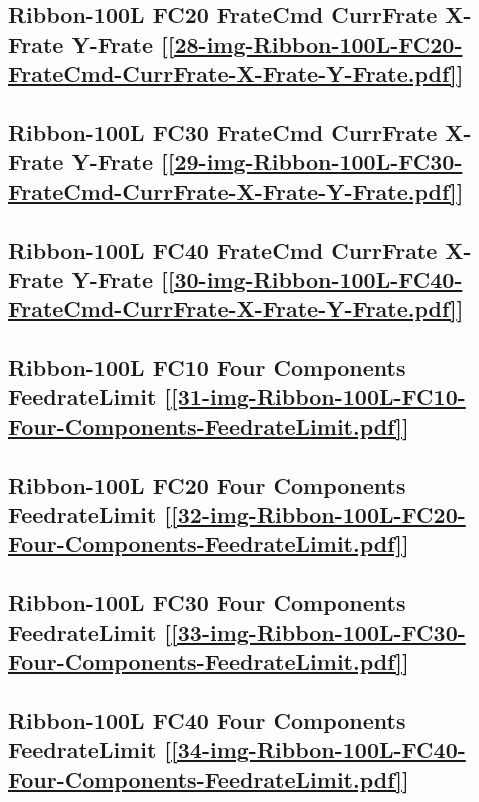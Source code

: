 \subsection       {Ribbon-100L FC20 FrateCmd CurrFrate X-Frate Y-Frate
	[\ref      {28-img-Ribbon-100L-FC20-FrateCmd-CurrFrate-X-Frate-Y-Frate.pdf}] }
\label{ssec-28-img-Ribbon-100L-FC20-FrateCmd-CurrFrate-X-Frate-Y-Frate.pdf}

\subsection       {Ribbon-100L FC30 FrateCmd CurrFrate X-Frate Y-Frate
	[\ref      {29-img-Ribbon-100L-FC30-FrateCmd-CurrFrate-X-Frate-Y-Frate.pdf}] }
\label{ssec-29-img-Ribbon-100L-FC30-FrateCmd-CurrFrate-X-Frate-Y-Frate.pdf}

\subsection       {Ribbon-100L FC40 FrateCmd CurrFrate X-Frate Y-Frate
	[\ref      {30-img-Ribbon-100L-FC40-FrateCmd-CurrFrate-X-Frate-Y-Frate.pdf}] }
\label{ssec-30-img-Ribbon-100L-FC40-FrateCmd-CurrFrate-X-Frate-Y-Frate.pdf}

\subsection       {Ribbon-100L FC10 Four Components FeedrateLimit
	[\ref      {31-img-Ribbon-100L-FC10-Four-Components-FeedrateLimit.pdf}] }
\label{ssec-31-img-Ribbon-100L-FC10-Four-Components-FeedrateLimit.pdf}

\subsection       {Ribbon-100L FC20 Four Components FeedrateLimit
	[\ref      {32-img-Ribbon-100L-FC20-Four-Components-FeedrateLimit.pdf}] }
\label{ssec-32-img-Ribbon-100L-FC20-Four-Components-FeedrateLimit.pdf}

\subsection       {Ribbon-100L FC30 Four Components FeedrateLimit
	[\ref      {33-img-Ribbon-100L-FC30-Four-Components-FeedrateLimit.pdf}] }
\label{ssec-33-img-Ribbon-100L-FC30-Four-Components-FeedrateLimit.pdf}

\subsection       {Ribbon-100L FC40 Four Components FeedrateLimit
	[\ref      {34-img-Ribbon-100L-FC40-Four-Components-FeedrateLimit.pdf}]}
\label{ssec-34-img-Ribbon-100L-FC40-Four-Components-FeedrateLimit.pdf}

